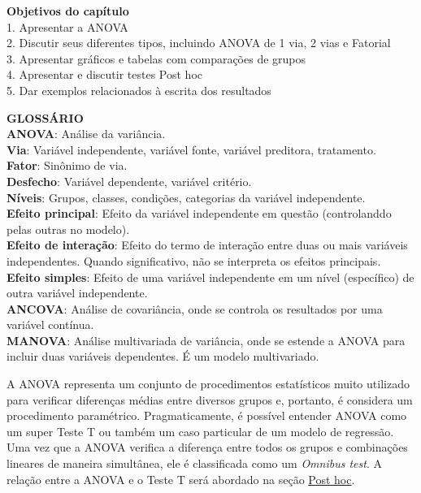 \documentclass[
]{book}
\begin{document}
\begin{objectives}
\textbf{Objetivos do capítulo}\\
1. Apresentar a ANOVA\\
2. Discutir seus diferentes tipos, incluindo ANOVA de 1 via, 2 vias e
Fatorial\\
3. Apresentar gráficos e tabelas com comparações de grupos\\
4. Apresentar e discutir testes Post hoc\\
5. Dar exemplos relacionados à escrita dos resultados
\end{objectives}

\begin{glossario}
\textbf{GLOSSÁRIO}\\
\textbf{ANOVA}: Análise da variância.\\
\textbf{Via}: Variável independente, variável fonte, variável preditora,
tratamento.\\
\textbf{Fator}: Sinônimo de via.\\
\textbf{Desfecho}: Variável dependente, variável critério.\\
\textbf{Níveis}: Grupos, classes, condições, categorias da variável
independente.\\
\textbf{Efeito principal}: Efeito da variável independente em questão
(controlanddo pelas outras no modelo).\\
\textbf{Efeito de interação}: Efeito do termo de interação entre duas ou
mais variáveis independentes. Quando significativo, não se interpreta os
efeitos principais.\\
\textbf{Efeito simples}: Efeito de uma variável independente em um nível
(específico) de outra variável independente.\\
\textbf{ANCOVA}: Análise de covariância, onde se controla os resultados
por uma variável contínua.\\
\textbf{MANOVA}: Análise multivariada de variância, onde se estende a
ANOVA para incluir duas variáveis dependentes. É um modelo multivariado.
\end{glossario}

A ANOVA representa um conjunto de procedimentos estatísticos muito
utilizado para verificar diferenças médias entre diversos grupos e,
portanto, é considera um procedimento paramétrico. Pragmaticamente, é
possível entender ANOVA como um super Teste T ou também um caso
particular de um modelo de regressão. Uma vez que a ANOVA verifica a
diferença entre todos os grupos e combinações lineares de maneira
simultânea, ele é classificada como um \emph{Omnibus test}. A relação
entre a ANOVA e o Teste T será abordado na seção
\protect\hyperlink{post-hoc}{Post hoc}.
\end{document}
